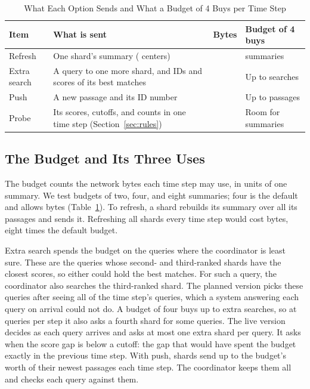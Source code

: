 \begin{table}[!t]
\centering
\caption{What Each Option Sends and What a Budget of 4 Buys per Time Step}
\label{tab:options}
\footnotesize
\setlength{\tabcolsep}{3pt}
\begin{tabular}{@{}l>{\raggedright\arraybackslash}p{4.2cm}r>{\raggedright\arraybackslash}p{1.55cm}@{}}
\toprule
Item & What is sent & Bytes & Budget of 4 buys \\
\midrule
Refresh & One shard's summary (\RNumCentersPerSummary{} centers) & \RNumSummaryBytes{} & \RNumFourRulesSummariesBFour{} summaries \\
Extra search & A query to one more shard, and IDs and scores of its \RNumPlainTopK{} best matches & \RNumPlainSearchBytes{} & Up to \RNumExtraSearchesBFour{} searches \\
Push & A new passage and its ID number & \RNumPlainPushBytes{} & Up to \RNumPushedVecsBFourPerEpoch{} passages \\
\midrule
Probe & Its scores, cutoffs, and counts in one time step (Section~\ref{sec:rules}) & \RNumRNOverheadEpochBytes{} & Room for \RNumRNSummariesBFour{} summaries \\
\bottomrule
\end{tabular}
\end{table}

\subsection{The Budget and Its Three Uses}

The budget counts the network bytes each time step may use, in units of one summary.
We test budgets of two, four, and eight summaries; four is the default and allows \RNumBudgetBFourEpochBytes{} bytes (Table~\ref{tab:options}).
To refresh, a shard rebuilds its summary over all its passages and sends it.
Refreshing all \RNumNumShards{} shards every time step would cost \RNumAlwaysFreshEpochBytes{} bytes, eight times the default budget.

Extra search spends the budget on the queries where the coordinator is least sure.
These are the queries whose second- and third-ranked shards have the closest scores, so either could hold the best matches.
For such a query, the coordinator also searches the third-ranked shard.
The planned version picks these queries after seeing all of the time step's queries, which a system answering each query on arrival could not do.
A budget of four buys up to \RNumExtraSearchesBFour{} extra searches, so at \RNumPlainQueriesLow{} queries per step it also asks a fourth shard for some queries.
The live version decides as each query arrives and asks at most one extra shard per query.
It asks when the score gap is below a cutoff: the gap that would have spent the budget exactly in the previous time step.
With push, shards send up to the budget's worth of their newest passages each time step.
The coordinator keeps them all and checks each query against them.

